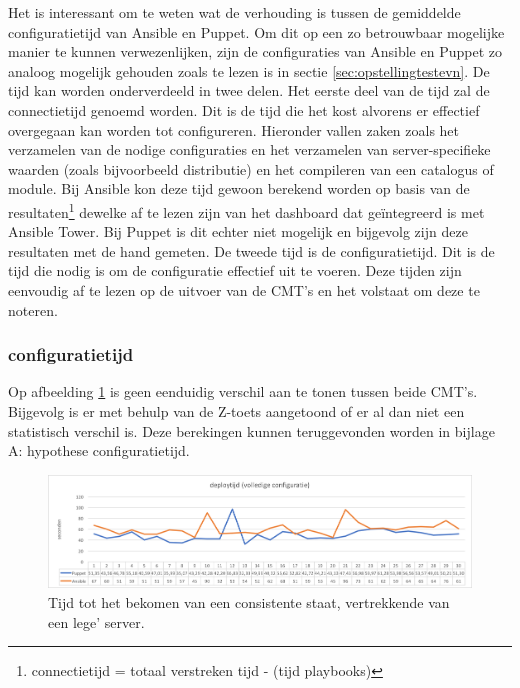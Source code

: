 Het is interessant om te weten wat de verhouding is tussen de gemiddelde \gls{configuratietijd} van Ansible en Puppet. Om dit op een zo betrouwbaar mogelijke manier te kunnen verwezenlijken, zijn de configuraties van Ansible en Puppet zo analoog mogelijk gehouden zoals te lezen is in sectie \ref{sec:opstellingtestevn}. De tijd kan worden onderverdeeld in twee delen.\newline
Het eerste deel van de tijd zal de \gls{connectietijd} genoemd worden. Dit is de tijd die het kost alvorens er effectief overgegaan kan worden tot configureren. Hieronder vallen zaken zoals het verzamelen van de nodige configuraties en het verzamelen van server-specifieke waarden (zoals bijvoorbeeld distributie) en het compileren van een catalogus of module. Bij Ansible kon deze tijd gewoon berekend worden op basis van de resultaten\footnote{connectietijd = totaal verstreken tijd -  \unexpanded{$ \sum  $} (tijd playbooks)} dewelke af te lezen zijn van het dashboard dat ge\"integreerd is met Ansible Tower. Bij Puppet is dit echter niet mogelijk en bijgevolg zijn deze resultaten met de hand gemeten.\newline
 De tweede tijd is de \gls{configuratietijd}. Dit is de tijd die nodig is om de configuratie effectief uit te voeren. Deze tijden zijn eenvoudig af te lezen op de uitvoer van de \gls{CMT}'s en het volstaat om deze te noteren.




\subsubsection{\gls{configuratietijd}}

Op afbeelding \ref{fig:deploytime_fullconfig} is geen eenduidig verschil aan te tonen tussen beide \gls{CMT}'s. Bijgevolg is er met behulp van de Z-toets aangetoond of er al dan niet een statistisch verschil is. Deze berekingen kunnen teruggevonden worden in bijlage A: hypothese configuratietijd.

\begin{figure}
	\includegraphics[width=\linewidth]{img/deploytime_fullconfig.png} 
	\caption{Tijd tot het bekomen van een consistente staat, vertrekkende van een lege' server.}  
	\label{fig:deploytime_fullconfig}
\end{figure}

